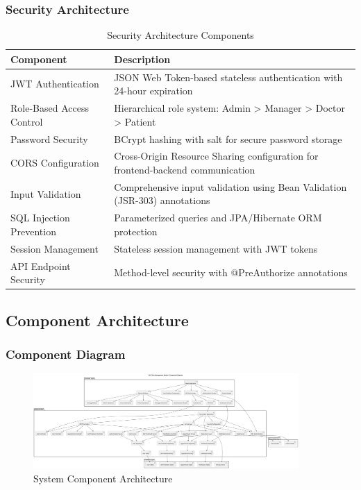 \documentclass[12pt,a4paper]{article}
\begin{document}
\subsubsection{Security Architecture}

\begin{table}[H]
\centering
\caption{Security Architecture Components}
\label{tab:security-architecture}
\begin{tabularx}{\textwidth}{|l|X|}
\hline
\textbf{Component} & \textbf{Description} \\
\hline
JWT Authentication & JSON Web Token-based stateless authentication with 24-hour expiration \\
\hline
Role-Based Access Control & Hierarchical role system: Admin > Manager > Doctor > Patient \\
\hline
Password Security & BCrypt hashing with salt for secure password storage \\
\hline
CORS Configuration & Cross-Origin Resource Sharing configuration for frontend-backend communication \\
\hline
Input Validation & Comprehensive input validation using Bean Validation (JSR-303) annotations \\
\hline
SQL Injection Prevention & Parameterized queries and JPA/Hibernate ORM protection \\
\hline
Session Management & Stateless session management with JWT tokens \\
\hline
API Endpoint Security & Method-level security with @PreAuthorize annotations \\
\hline
\end{tabularx}
\end{table}

\subsection{Component Architecture}

\subsubsection{Component Diagram}

\begin{figure}[H]
\centering
\includegraphics[width=0.9\textwidth]{diagrams/component_diagram.svg}
\caption{System Component Architecture}
\label{fig:component-diagram}
\end{figure}
\end{document}
